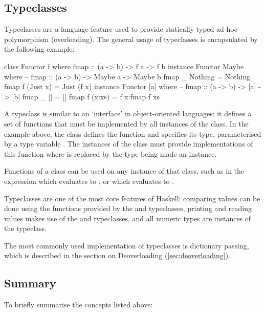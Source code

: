 \documentclass[dissertation.tex]{subfiles}
\begin{document}
{    \subsection{Typeclasses}\label{sec:typeclasses}
    {
        Typeclasses are a language feature used to provide statically typed ad-hoc polymorphism (overloading). The general usage of typeclasses is encapsulated by the following example: 

        \begin{haskellfigure}
        class Functor f where
            fmap :: (a -> b) -> f a -> f b
        instance Functor Maybe where
            -- fmap :: (a -> b) -> Maybe a -> Maybe b
            fmap _ Nothing = Nothing
            fmap f (Just x) = Just (f x)
        instance Functor [a] where
            -- fmap :: (a -> b) -> [a] -> [b]
            fmap _ [] = []
            fmap f (x:xs) = f x:fmap f xs
        \end{haskellfigure}

        A typeclass is similar to an `interface' in object-oriented languages: it defines a set of functions that must be implemented by all instances of the class. In the example above, the  class defines the  function and specifies its type, parameterised by a type variable . The instances of the class must provide implementations of this function where  is replaced by the type being made an instance.

        Functions of a class can be used on any instance of that class, such as in the expression  which evaluates to \haskell{[2,4,6]}, or  which evaluates to .

        Typeclasses are one of the most core features of Haskell: comparing values can be done using the functions provided by the  and  typeclasses, printing and reading values makes use of the  and  typeclasses, and all numeric types are instances of the  typeclass. 

        The most commonly used implementation of typeclasses is dictionary passing, which is described in the section on Deoverloading (\ref{sec:deoverloading}).
    }
    \subsection{Summary}
    {
        To briefly summarise the concepts listed above:

}}
\end{document}
